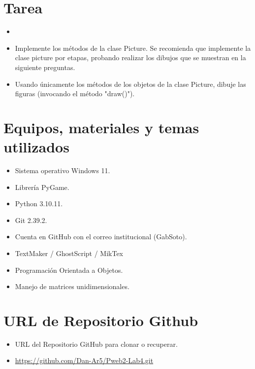 \documentclass{article}
\begin{document}
	\section{Tarea}
	\begin{itemize}		
 \item \item Implemente los métodos de la clase Picture. Se recomienda que implemente la clase picture por etapas, probando realizar los dibujos que se muestran en la siguiente preguntas.
		\item Usando únicamente los métodos de los objetos de la clase Picture, dibuje las figuras (invocando el método "draw()").
	\end{itemize}


	\section{Equipos, materiales y temas utilizados}
	\begin{itemize}
		\item Sistema operativo Windows 11.
		\item Librería PyGame.
		\item Python 3.10.11.
		\item Git 2.39.2.
		\item Cuenta en GitHub con el correo institucional (GabSoto).
		\item TextMaker / GhostScript / MikTex
		\item Programación Orientada a Objetos.
		\item Manejo de matrices unidimensionales.
	\end{itemize}


 \section{URL de Repositorio Github}
	\begin{itemize}
		\item URL del Repositorio GitHub para clonar o recuperar.
		\item \url{https://github.com/Dan-Ar5/Pweb2-Lab4.git}
	\end{itemize}
		
\end{document}
